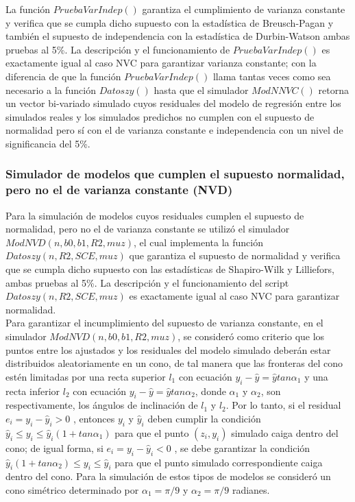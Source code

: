 La función $PruebaVarIndep()$ garantiza el cumplimiento de varianza constante y verifica que se cumpla dicho supuesto con la estadística de Breusch-Pagan y también el supuesto de independencia con la estadística de Durbin-Watson ambas pruebas al 5\%. La descripción y el funcionamiento de $PruebaVarIndep()$ es exactamente igual al caso NVC para garantizar varianza constante; con la diferencia de que la función $PruebaVarIndep()$ llama tantas veces como sea necesario a la función $Datoszy()$ hasta que el simulador $ModNNVC()$  retorna un vector bi-variado simulado cuyos residuales del modelo de regresión entre los simulados reales y los simulados predichos no cumplen con el supuesto de normalidad pero sí con el de varianza constante e independencia con un nivel de significancia del 5\%.\\ 

\subsubsection{Simulador de modelos que cumplen el supuesto normalidad, pero no el de varianza constante (NVD)}

Para la simulación de modelos cuyos residuales cumplen el supuesto de normalidad, pero no el de varianza constante se utilizó el simulador $ModNVD(n,b0,b1,R2,muz)$, el cual implementa la función $Datoszy(n,R2,SCE,muz)$ que garantiza el supuesto de normalidad y verifica que se cumpla dicho supuesto con las estadísticas de Shapiro-Wilk y Lilliefors, ambas pruebas al 5\%. La descripción y el funcionamiento del script $Datoszy(n,R2,SCE,muz)$ es exactamente igual al caso NVC para garantizar normalidad.\\


Para garantizar el incumplimiento del supuesto de varianza constante, en el simulador \newline $ModNVD(n,b0,b1,R2,muz)$, se consideró como criterio que los puntos entre los ajustados y los residuales del modelo simulado deberán estar distribuidos aleatoriamente en un cono, de tal manera que las fronteras del cono estén limitadas por una recta superior $l_1$ con ecuación $y_i-\hat{y}=\hat{y}tan \alpha_1$ y una recta inferior $l_2$ con ecuación $y_i-\hat{y}=\hat{y}tan \alpha_2$, donde  $\alpha_1$ y $\alpha_2$, son respectivamente, los ángulos de inclinación de $l_1$ y $l_2$. Por lo tanto, si el residual $e_i=y_i - \hat{y}_i > 0$ , entonces $y_i$ y $\hat{y}_i$ deben cumplir la condición $\hat{y}_i \leq y_i \leq \hat{y}_i (1+tan \alpha_1)$ para que el punto $(z_i,y_i)$ simulado caiga dentro del cono; de igual forma, si $e_i=y_i - \hat{y}_i < 0$ , se debe garantizar la condición $\hat{y}_i (1+tan \alpha_2) \leq y_i \leq \hat{y}_i $ para que el punto simulado correspondiente caiga dentro del cono. Para la simulación de estos tipos de modelos se consideró un cono simétrico determinado por $\alpha_1=\pi / 9$ y $\alpha_2=\pi/9$ radianes. \\


